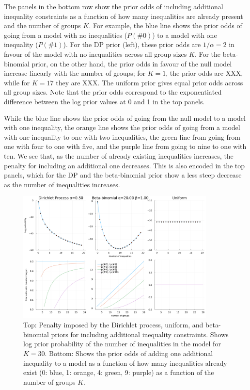 \documentclass[11pt,a4paper]{article}
\theoremstyle{definition} %
\theoremstyle{case}
\begin{document}
The panels in the bottom row show the prior odds of including additional inequality constraints as a function of how many inequalities are already present and the number of groups $K$. For example, the blue line shows the prior odds of going from a model with no inequalities ($P(\#0)$) to a model with one inequality ($P(\#1)$). For the DP prior (left), these prior odds are $1 / \alpha = 2$ in favour of the model with no inequalities across all group sizes $K$. For the beta-binomial prior, on the other hand, the prior odds in favour of the null model increase linearly with the number of groups; for $K = 1$, the prior odds are XXX, while for $K = 17$ they are XXX. The uniform prior gives equal prior odds across all group sizes. Note that the prior odds correspond to the exponentiated difference between the log prior values at 0 and 1 in the top panels.

While the blue line shows the prior odds of going from the null model to a model with one inequality, the orange line shows the prior odds of going from a model with one inequality to one with two inequalities, the green line from going from one with four to one with five, and the purple line from going to nine to one with ten. We see that, as the number of already existing inequalities increases, the penalty for including an additional one decreases. This is also encoded in the top panels, which for the DP and the beta-binomial prior show a less steep decrease as the number of inequalities increases.

\begin{figure}
    \centering
    \includegraphics[width=0.89\textwidth]{figures/prior_comparison_plot_2x3_without_log_without_betabinomial.pdf}
    \caption{Top: Penalty imposed by the Dirichlet process, uniform, and beta-binomial priors for including additional inequality constraints. Shows log prior probability of the number of inequalities in the model for $K = 30$. Bottom: Shows the prior odds of adding one additional inequality to a model as a function of how many inequalities already exist (0: blue, 1: orange, 4: green, 9: purple) as a function of the number of groups $K$.}
    \label{fig:scott_berger}
\end{figure}
\end{document}
